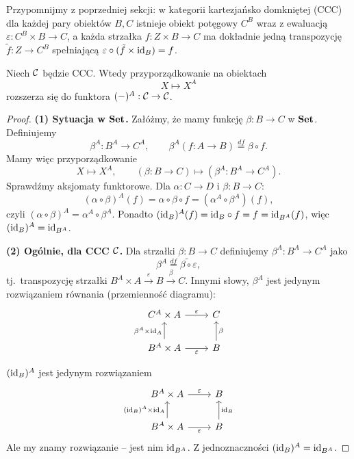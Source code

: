 Przypomnijmy z poprzedniej sekcji: w kategorii kartezjańsko domkniętej (CCC) dla każdej pary obiektów $B, C$ istnieje obiekt potęgowy $C^B$ wraz z ewaluacją $\varepsilon \colon C^B \times B \to C$, a każda strzałka $f \colon Z \times B \to C$ ma dokładnie jedną transpozycję $\tilde{f} \colon Z \to C^B$ spełniającą $\varepsilon \circ (\tilde{f} \times \mathrm{id}_B) = f$.

\begin{stwierdzenie}
Niech $\mathcal{C}$ będzie CCC. Wtedy przyporządkowanie na obiektach
\[
X \longmapsto X^A
\]
rozszerza się do funktora $(-)^A : \mathcal{C} \to \mathcal{C}$.
\end{stwierdzenie}

\begin{proof}
\textbf{(1) Sytuacja w $\mathbf{Set}$.} Załóżmy, że mamy funkcję $\beta : B \to C$ w $\mathbf{Set}$. Definiujemy
\[
\beta^A : B^A \longrightarrow C^A, \qquad \beta^A(f : A \to B) \stackrel{df}{=} \beta \circ f.
\]
Mamy więc przyporządkowanie
\[
X \longmapsto X^A, \qquad (\beta : B \to C) \longmapsto (\beta^A : B^A \to C^A).
\]
Sprawdźmy aksjomaty funktorowe. Dla $\alpha : C \to D$ i $\beta : B \to C$:
\[
(\alpha \circ \beta)^A(f) = \alpha \circ \beta \circ f = (\alpha^A \circ \beta^A)(f),
\]
czyli $(\alpha \circ \beta)^A = \alpha^A \circ \beta^A$. Ponadto $(\mathrm{id}_B)^A(f) = \mathrm{id}_B \circ f = f = \mathrm{id}_{B^A}(f)$, więc $(\mathrm{id}_B)^A = \mathrm{id}_{B^A}$.

\textbf{(2) Ogólnie, dla CCC $\mathcal{C}$.} Dla strzałki $\beta : B \to C$ definiujemy $\beta^A : B^A \to C^A$ jako
\[
\beta^A \stackrel{df}{=} \widetilde{\beta \circ \varepsilon},
\]
tj.\ transpozycję strzałki $B^A \times A \xrightarrow{\varepsilon} B \xrightarrow{\beta} C$. Innymi słowy, $\beta^A$ jest jedynym rozwiązaniem równania (przemienność diagramu):
\[
\begin{tikzcd}
C^A \times A \arrow[r, "\varepsilon"] & C \\
B^A \times A \arrow[u, "\beta^A \times \id_A"] \arrow[r, "\varepsilon"'] & B \arrow[u, "\beta"']
\end{tikzcd}
\]

$(\mathrm{id}_B)^A$ jest jedynym rozwiązaniem
\[
\begin{tikzcd}
B^A \times A \arrow[r, "\varepsilon"] & B \\
B^A \times A \arrow[u, "(\id_B)^A \times \id_A"] \arrow[r, "\varepsilon"'] & B \arrow[u, "\id_B"']
\end{tikzcd}
\]
Ale my znamy rozwiązanie -- jest nim $\mathrm{id}_{B^A}$. Z jednoznaczności $(\mathrm{id}_B)^A = \mathrm{id}_{B^A}$.


\end{proof}
